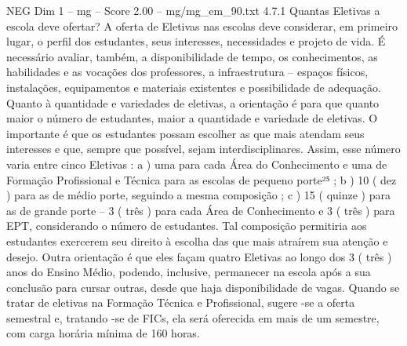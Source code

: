\begin{textsample}{NEG Dim 1 – mg – Score 2.00 – mg/mg\_em\_90.txt}  \label{ex:f1_neg_052}
4.7.1 Quantas Eletivas a escola deve ofertar?
A oferta de Eletivas nas escolas deve considerar, em primeiro lugar, o perfil dos estudantes, seus interesses, necessidades e projeto de vida.
É necessário avaliar, também, a disponibilidade de tempo, os conhecimentos, as habilidades e as vocações dos professores, a infraestrutura – espaços físicos, instalações, equipamentos e materiais existentes e possibilidade de adequação.
Quanto à quantidade e variedades de eletivas, a orientação é para que quanto maior o número de estudantes, maior a quantidade e variedade de eletivas.
O importante é que os estudantes possam escolher as que mais atendam seus interesses e que, sempre que possível, sejam interdisciplinares.
Assim, esse número varia entre cinco Eletivas : a ) uma para cada Área do Conhecimento e uma de Formação Profissional e Técnica para as escolas de pequeno porte²⁵ ; b ) 10 ( dez ) para as de médio porte, seguindo a mesma composição ; c ) 15 ( quinze ) para as de grande porte – 3 ( três ) para cada Área de Conhecimento e 3 ( três ) para EPT, considerando o número de estudantes.
Tal composição permitiria aos estudantes exercerem seu direito à escolha das que mais atraírem sua atenção e desejo.
Outra orientação é que eles façam quatro Eletivas ao longo dos 3 ( três ) anos do Ensino Médio, podendo, inclusive, permanecer na escola após a sua conclusão para cursar outras, desde que haja disponibilidade de vagas.
Quando se tratar de eletivas na Formação Técnica e Profissional, sugere -se a oferta semestral e, tratando -se de FICs, ela será oferecida em mais de um semestre, com carga horária mínima de 160 horas.

\end{textsample}
